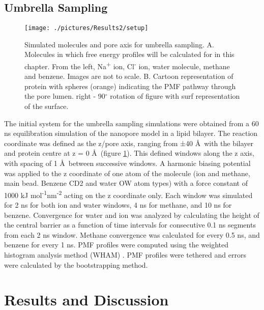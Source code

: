 \subsection{Umbrella Sampling}

\begin{figure}[H]
\begin{center}
\texttt{[image: ./pictures/Results2/setup]}
\caption[Simulated molecules and pore axis for umbrella sampling.] {Simulated molecules and pore axis for umbrella sampling. A. Molecules in which free energy profiles will be calculated for in this chapter. From the left, Na\textsuperscript{+} ion, Cl\textsuperscript{-} ion, water molecule, methane and benzene. Images are not to scale. B. Cartoon representation of protein with spheres (orange) indicating the PMF pathway through the pore lumen. right - 90$^{\circ}$ rotation of figure with surf representation of the surface.} %
\label{fig:setup-rc3}
\end{center}
\end{figure}


The initial system for the umbrella sampling simulations were obtained from a 60 ns equilibration simulation of the nanopore model in a lipid bilayer. The reaction coordinate was defined as the z/pore axis, ranging from ±40 \AA\ with the bilayer and protein centre at z = 0 \AA\ (figure \ref{fig:setup-rc3}). This defined  windows along the z axis, with spacing of 1 \AA\ between successive windows. A harmonic biasing potential was applied to the z coordinate of one atom of the molecule (ion and methane, main bead. Benzene CD2 and water OW atom types) with a force constant of 1000 kJ mol\textsuperscript{-1}nm\textsuperscript{-2} acting on the z coordinate only. Each window was simulated for 2 ns for both ion and water windows, 4 ns for methane, and 10 ns for benzene. Convergence for water and ion was analyzed by calculating the height of the central barrier as a function of time intervals for consecutive 0.1 ns segments from each 2 ns window. Methane convergence was calculated for every 0.5 ns, and benzene for every 1 ns. PMF profiles were computed using the weighted histogram analysis method (WHAM) \cite{Grossfield}. PMF profiles were tethered and errors were calculated by the bootstrapping method. 

\section{Results and Discussion}

